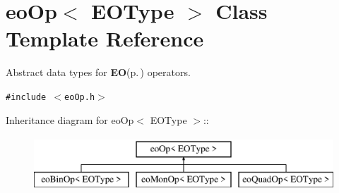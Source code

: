 \section{eo\-Op$<$ EOType $>$ Class Template Reference}
\label{classeo_op}
Abstract data types for {\bf EO}{\rm (p.\,\pageref{class_e_o})} operators.  


{\tt \#include $<$eo\-Op.h$>$}

Inheritance diagram for eo\-Op$<$ EOType $>$::\begin{figure}[H]
\begin{center}
\leavevmode
\includegraphics[height=2cm]{classeo_op}
\end{center}
\end{figure}
